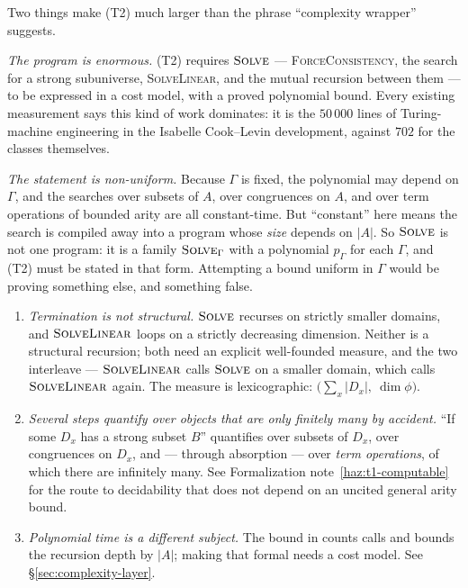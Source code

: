 \begin{hazard}\label{haz:t2-is-not-small}
Two things make \textup{(T2)} much larger than the phrase ``complexity
wrapper'' suggests.

\emph{The program is enormous.} \textup{(T2)} requires $\textsc{Solve}$ ---
\textsc{ForceConsistency}, the search for a strong subuniverse,
\textsc{SolveLinear}, and the mutual recursion between them --- to be expressed
in a cost model, with a proved polynomial bound. Every existing measurement
says this kind of work dominates: it is the $50\,000$ lines of Turing-machine
engineering in the Isabelle Cook--Levin development, against $702$ for the
classes themselves.

\emph{The statement is non-uniform.} Because $\Gamma$ is fixed, the polynomial
may depend on $\Gamma$, and the searches over subsets of $A$, over congruences
on $A$, and over term operations of bounded arity are all constant-time. But
``constant'' here means the search is compiled away into a program whose
\emph{size} depends on $|A|$. So $\textsc{Solve}$ is not one program: it is a
family $\textsc{Solve}_{\Gamma}$ with a polynomial $p_{\Gamma}$ for each
$\Gamma$, and \textup{(T2)} must be stated in that form. Attempting a bound
uniform in $\Gamma$ would be proving something else, and something false.
\end{hazard}

\begin{hazard}
\label{haz:algorithm-formalization}
\begin{enumerate}\alphlabels\tightlist
\item \emph{Termination is not structural.} $\textsc{Solve}$ recurses on
  strictly smaller domains, and $\textsc{SolveLinear}$ loops on a strictly
  decreasing dimension. Neither is a structural recursion; both need an
  explicit well-founded measure, and the two interleave ---
  $\textsc{SolveLinear}$ calls $\textsc{Solve}$ on a smaller domain, which
  calls $\textsc{SolveLinear}$ again. The measure is lexicographic:
  $\bigl(\sum_{x}|D_{x}|,\ \dim\phi\bigr)$.
\item \emph{Several steps quantify over objects that are only finitely many by
  accident.} ``If some $D_{x}$ has a strong subset $B$'' quantifies over
  subsets of $D_{x}$, over congruences on $D_{x}$, and --- through absorption
  --- over \emph{term operations}, of which there are infinitely many. See
  Formalization note~\ref{haz:t1-computable} for the route to decidability that does not
  depend on an uncited general arity bound.
\item \emph{Polynomial time is a different subject.} The bound in
  \cite{ZhukJACM} counts calls and bounds the recursion depth by $|A|$; making
  that formal needs a cost model. See \S\ref{sec:complexity-layer}.
\end{enumerate}
\end{hazard}

